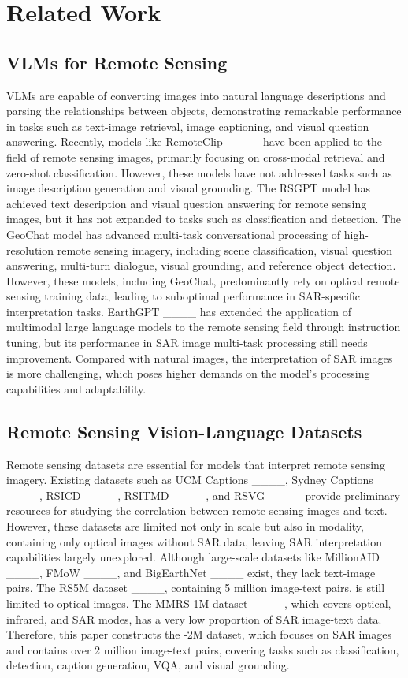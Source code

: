 \section{Related Work}
\subsection{VLMs for Remote Sensing}
VLMs are capable of converting images into natural language descriptions and parsing the relationships between objects, demonstrating remarkable performance in tasks such as text-image retrieval, image captioning, and visual question answering. Recently, models like RemoteClip ____ have been applied to the field of remote sensing images, primarily focusing on cross-modal retrieval and zero-shot classification. However, these models have not addressed tasks such as image description generation and visual grounding. The RSGPT model has achieved text description and visual question answering for remote sensing images, but it has not expanded to tasks such as classification and detection. The GeoChat model has advanced multi-task conversational processing of high-resolution remote sensing imagery, including scene classification, visual question answering, multi-turn dialogue, visual grounding, and reference object detection. However, these models, including GeoChat, predominantly rely on optical remote sensing training data, leading to suboptimal performance in SAR-specific interpretation tasks. EarthGPT ____ has extended the application of multimodal large language models to the remote sensing field through instruction tuning, but its performance in SAR image multi-task processing still needs improvement. Compared with natural images, the interpretation of SAR images is more challenging, which poses higher demands on the model's processing capabilities and adaptability.

\subsection{Remote Sensing Vision-Language Datasets}
Remote sensing datasets are essential for models that interpret remote sensing imagery. Existing datasets such as UCM Captions ____, Sydney Captions ____, RSICD ____, RSITMD ____, and RSVG ____ provide preliminary resources for studying the correlation between remote sensing images and text. However, these datasets are limited not only in scale but also in modality, containing only optical images without SAR data, leaving SAR interpretation capabilities largely unexplored. Although large-scale datasets like MillionAID ____, FMoW ____, and BigEarthNet ____ exist, they lack text-image pairs. The RS5M  dataset ____, containing 5 million image-text pairs, is still limited to optical images. The MMRS-1M dataset ____, which covers optical, infrared, and SAR modes, has a very low proportion of SAR image-text data. Therefore, this paper constructs the \ourmethod-2M dataset, which focuses on SAR images and contains over 2 million image-text pairs, covering tasks such as classification, detection, caption generation, VQA, and visual grounding.